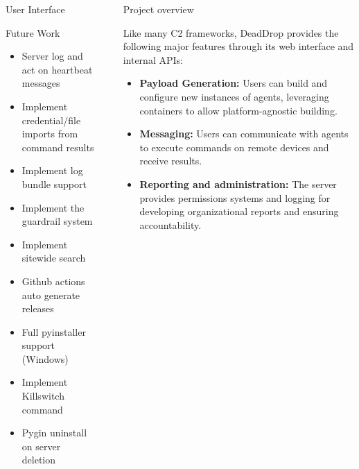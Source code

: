 \documentclass[final]{beamer}
\newlength{\sepwidth}
\newlength{\colwidth}
\newcommand{\separatorcolumn}{\begin{column}{\sepwidth}\end{column}}
\begin{document}
\begin{frame}[t]
\begin{columns}[t]
\begin{column}{\colwidth}
\begin{block}{User Interface}
  \end{block}

  \begin{block}{Future Work}

      \begin{itemize}
        \item Server log and act on heartbeat messages
        \item Implement credential/file imports from command results
        \item Implement log bundle support
        \item Implement the guardrail system
        \item Implement sitewide search
      \end{itemize}
      \begin{itemize}
        \item Github actions auto generate releases
        \item Full pyinstaller support (Windows)
        \item Implement Killswitch command
        \item Pygin uninstall on server deletion
      \end{itemize}
  \end{block}


\end{column}

\separatorcolumn

\begin{column}{\colwidth}

  \begin{block}{Project overview}

    Like many C2 frameworks, DeadDrop provides the following major features through its web interface and internal APIs:

    \begin{itemize}
      \item \textbf{Payload Generation:}
        Users can build and configure new instances of agents, leveraging containers to allow platform-agnostic building.
      \item \textbf{Messaging:}
        Users can communicate with agents to execute commands on remote devices and receive results.
      \item \textbf{Reporting and administration:}
        The server provides permissions systems and logging for developing organizational reports and ensuring accountability.
    \end{itemize}


\end{block}
\end{column}
\end{columns}
\end{frame}
\end{document}
